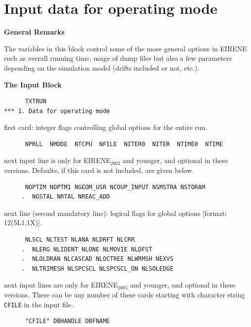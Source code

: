 \section{Input data for operating mode} \label{sec2.1}

\textbf{General Remarks} 

\medskip 

The variables in this block control some of the more general options in EIRENE
such as overall running time, usage of dump files but also a few parameters
depending on the simulation model (drifts included or not, etc.).

\medskip

\textbf{The Input Block} 

\begin{lstlisting}
      TXTRUN
*** 1. Data for operating mode
\end{lstlisting} 

first card:  integer flags controlling global options for the entire run.

\begin{lstlisting}
      NPRLL  NMODE  NTCPU  NFILE  NITER0  NITER  NTIME0  NTIME
\end{lstlisting}

next input line is only for EIRENE$_{2002}
$ and younger, and optional in these versions.
Defaults, if this card is not included, are given below.

\begin{lstlisting}
      NOPTIM NOPTM1 NGEOM_USR NCOUP_INPUT NSMSTRA NSTORAM
     .  NGSTAL NRTAL NREAC_ADD
\end{lstlisting}

next line (second mandatory line): logical flags for global options [format:
    12(5L1,1X)].

\begin{lstlisting}
      NLSCL NLTEST NLANA NLDRFT NLCRR
     .  NLERG NLIDENT NLONE NLMOVIE NLDFST
     .  NLOLDRAN NLCASCAD NLOCTREE NLWRMSH NEXVS
     .  NLTRIMESH NLSPCSCL NLSPCSCL_ON NLSOLEDGE
\end{lstlisting}

next input lines are only for EIRENE$_{2005}
$ and younger, and optional in these versions.
There can be any number of these cards starting with character string
\lstinline|CFILE|	  in the input file.

\begin{lstlisting}
      "CFILE" DBHANDLE DBFNAME
\end{lstlisting}

